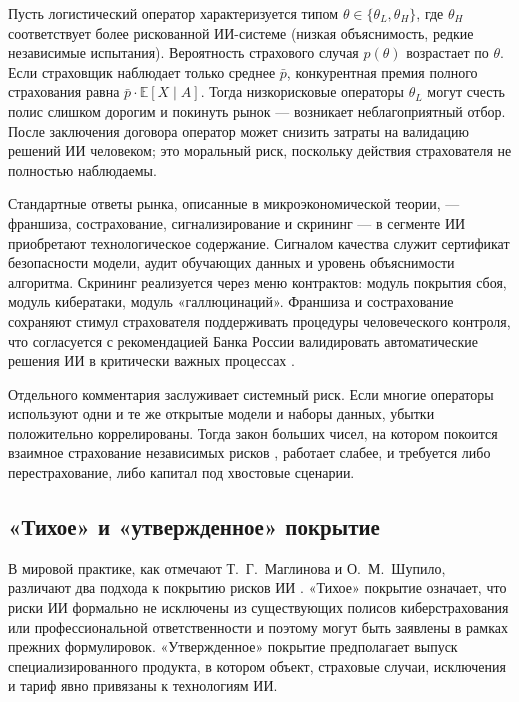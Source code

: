 \documentclass[a4paper,14pt]{extarticle}
\begin{document}
Пусть логистический оператор характеризуется типом $\theta\in\{\theta_L,\theta_H\}$, где $\theta_H$ соответствует более рискованной ИИ-системе (низкая объяснимость, редкие независимые испытания). Вероятность страхового случая $p(\theta)$ возрастает по $\theta$. Если страховщик наблюдает только среднее $\bar p$, конкурентная премия полного страхования равна $\bar p\cdot\mathbb{E}[X\mid A]$. Тогда низкорисковые операторы $\theta_L$ могут счесть полис слишком дорогим и покинуть рынок --- возникает неблагоприятный отбор. После заключения договора оператор может снизить затраты на валидацию решений ИИ человеком; это моральный риск, поскольку действия страхователя не полностью наблюдаемы.

Стандартные ответы рынка, описанные в микроэкономической теории, --- франшиза, сострахование, сигнализирование и скрининг \cite{pindyck} --- в сегменте ИИ приобретают технологическое содержание. Сигналом качества служит сертификат безопасности модели, аудит обучающих данных и уровень объяснимости алгоритма. Скрининг реализуется через меню контрактов: модуль покрытия сбоя, модуль кибератаки, модуль «галлюцинаций». Франшиза и сострахование сохраняют стимул страхователя поддерживать процедуры человеческого контроля, что согласуется с рекомендацией Банка России валидировать автоматические решения ИИ в критически важных процессах \cite{cbr}.

Отдельного комментария заслуживает системный риск. Если многие операторы используют одни и те же открытые модели и наборы данных, убытки положительно коррелированы. Тогда закон больших чисел, на котором покоится взаимное страхование независимых рисков \cite{shvedov}, работает слабее, и требуется либо перестрахование, либо капитал под хвостовые сценарии.

\subsection{«Тихое» и «утвержденное» покрытие}

В мировой практике, как отмечают Т.~Г.~Маглинова и О.~М.~Шупило, различают два подхода к покрытию рисков ИИ \cite{maglinova, zezina}. «Тихое» покрытие означает, что риски ИИ формально не исключены из существующих полисов киберстрахования или профессиональной ответственности и поэтому могут быть заявлены в рамках прежних формулировок. «Утвержденное» покрытие предполагает выпуск специализированного продукта, в котором объект, страховые случаи, исключения и тариф явно привязаны к технологиям ИИ.
\end{document}
